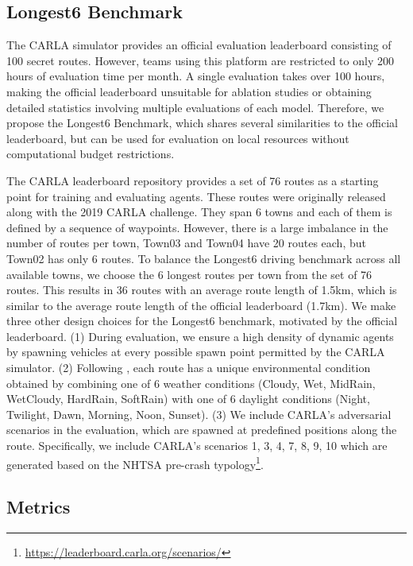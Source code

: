 \subsection{Longest6 Benchmark}
\label{sec:benchmark}

The CARLA simulator provides an official evaluation leaderboard consisting of 100 secret routes. However, teams using this platform are restricted to only 200 hours of evaluation time per month. A single evaluation takes over 100 hours, making the official leaderboard unsuitable for ablation studies or obtaining detailed statistics involving multiple evaluations of each model. Therefore, we propose the Longest6 Benchmark, which shares several similarities to the official leaderboard, but can be used for evaluation on local resources without computational budget restrictions.

The CARLA leaderboard repository provides a set of 76 routes as a starting point for training and evaluating agents. These routes were originally released along with the 2019 CARLA challenge. They span 6 towns and each of them is defined by a sequence of waypoints. However, there is a large imbalance in the number of routes per town, \eg Town03 and Town04 have 20 routes each, but Town02 has only 6 routes. To balance the Longest6 driving benchmark across all available towns, we choose the 6 longest routes per town from the set of 76 routes. This results in 36 routes with an average route length of 1.5km, which is similar to the average route length of the official leaderboard (1.7km). We make three other design choices for the Longest6 benchmark, motivated by the official leaderboard. (1) During evaluation, we ensure a high density of dynamic agents by spawning vehicles at every possible spawn point permitted by the CARLA simulator. (2) Following \cite{Chitta2021ICCV}, each route has a unique environmental condition obtained by combining one of 6 weather conditions (Cloudy, Wet, MidRain, WetCloudy, HardRain, SoftRain) with one of 6 daylight conditions (Night, Twilight, Dawn, Morning, Noon, Sunset). (3) We include CARLA's adversarial scenarios in the evaluation, which are spawned at predefined positions along the route. Specifically, we include CARLA's scenarios 1, 3, 4, 7, 8, 9, 10 which are generated based on the NHTSA pre-crash typology\footnote{\url{https://leaderboard.carla.org/scenarios/}}. 

\subsection{Metrics}
\label{sec:metrics}

